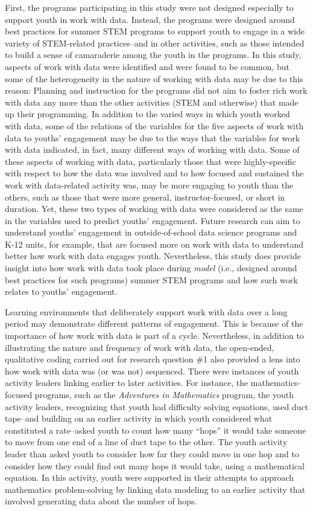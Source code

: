\documentclass[]{book}
\theoremstyle{definition}
\theoremstyle{definition}
\theoremstyle{definition}
\theoremstyle{remark}
\begin{document}
First, the programs participating in this study were not designed
especially to support youth in work with data. Instead, the programs
were designed around best practices for summer STEM programs to support
youth to engage in a wide variety of STEM-related practices--and in
other activities, such as those intended to build a sense of camaraderie
among the youth in the programs. In this study, aspects of work with
data were identified and were found to be common, but some of the
heterogeneity in the nature of working with data may be due to this
reason: Planning and instruction for the programs did not aim to foster
rich work with data any more than the other activities (STEM and
otherwise) that made up their programming. In addition to the varied
ways in which youth worked with data, some of the relations of the
variables for the five aspects of work with data to youths' engagement
may be due to the ways that the variables for work with data indicated,
in fact, many different ways of working with data. Some of these aspects
of working with data, particularly those that were highly-specific with
respect to how the data was involved and to how focused and sustained
the work with data-related activity was, may be more engaging to youth
than the others, such as those that were more general,
instructor-focused, or short in duration. Yet, these two types of
working with data were considered as the same in the variables used to
predict youths' engagement. Future research can aim to understand
youths' engagement in outside-of-school data science programs and K-12
units, for example, that are focused more on work with data to
understand better how work with data engages youth. Nevertheless, this
study does provide insight into how work with data took place during
\emph{model} (i.e., designed around best practices for such programs)
summer STEM programs and how such work relates to youths' engagement.

Learning environments that deliberately support work with data over a
long period may demonstrate different patterns of engagement. This is
because of the importance of how work with data is part of a cycle.
Nevertheless, in addition to illustrating the nature and frequency of
work with data, the open-ended, qualitative coding carried out for
research question \#1 also provided a lens into how work with data was
(or was not) sequenced. There were instances of youth activity leaders
linking earlier to later activities. For instance, the
mathematics-focused programs, such as the \emph{Adventures in
Mathematics} program, the youth activity leaders, recognizing that youth
had difficulty solving equations, used duct tape--and building on an
earlier activity in which youth considered what constituted a
rate--asked youth to count how many ``hops'' it would take someone to
move from one end of a line of duct tape to the other. The youth
activity leader than asked youth to consider how far they could move in
one hop and to consider how they could find out many hops it would take,
using a mathematical equation. In this activity, youth were supported in
their attempts to approach mathematics problem-solving by linking data
modeling to an earlier activity that involved generating data about the
number of hops.
\end{document}

